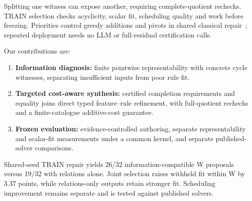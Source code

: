 Splitting one witness can expose another, requiring complete-quotient rechecks.
TRAIN selection checks acyclicity, scalar fit, scheduling quality and work
before freezing. Priorities control greedy additions and pivots in shared
classical repair~\cite{lamm2019weighted,grossmann2025chils}; repeated deployment
needs no LLM or full-residual certification calls.

Our contributions are:
\begin{enumerate}
\item \textbf{Information diagnosis:} finite pointwise representability with
concrete cycle witnesses, separating insufficient inputs from poor rule fit.
\item \textbf{Targeted cost-aware synthesis:} certified completion requirements
and equality joins direct typed feature--rule refinement, with full-quotient
rechecks and a finite-catalogue additive-cost guarantee.
\item \textbf{Frozen evaluation:} evidence-controlled authoring, separate
representability and scalar-fit measurements under a common kernel,
and separate published-solver comparisons.
\end{enumerate}
Shared-seed TRAIN repair yields 26/32 information-compatible W proposals
versus 19/32 with relations alone. Joint selection raises withheld fit within
W by 3.37 points, while relations-only outputs retain stronger fit.
Scheduling improvement remains separate and is tested against published solvers.
